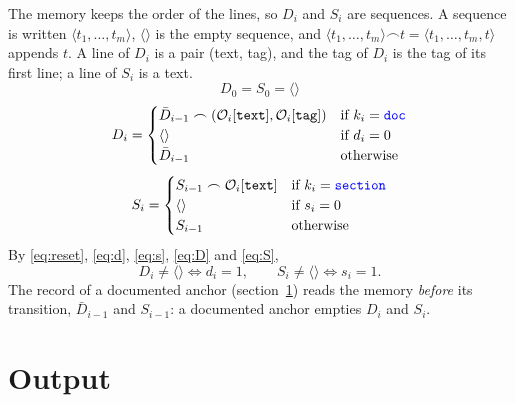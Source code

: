 \documentclass[11pt]{article}
\newcommand{\kind}[1]{\textcolor{blue}{\texttt{#1}}}
\newcommand{\field}[1]{\texttt{#1}}
\newcommand{\Obs}[1]{\mathcal{O}_i[\field{#1}]}
\newcommand{\emptyseq}{\langle\rangle}
\begin{document}
The memory keeps the order of the lines, so $D_i$ and $S_i$ are sequences. A sequence is
written $\langle t_1, \dots, t_m \rangle$, $\emptyseq$ is the empty sequence, and
$\langle t_1, \dots, t_m \rangle \frown t = \langle t_1, \dots, t_m, t \rangle$ appends $t$.
A line of $D_i$ is a pair (text, tag), and the tag of $D_i$ is the tag of its first line; a
line of $S_i$ is a text.
\begin{equation}
  D_0 = S_0 = \emptyseq
  \label{eq:memory-init}
\end{equation}
\begin{equation}
  D_i =
  \begin{cases}
    \bar D_{i-1} \frown (\Obs{text}, \Obs{tag}) & \text{if } k_i = \kind{doc}\\
    \emptyseq & \text{if } d_i = 0\\
    \bar D_{i-1} & \text{otherwise}
  \end{cases}
  \label{eq:D}
\end{equation}
\begin{equation}
  S_i =
  \begin{cases}
    S_{i-1} \frown \Obs{text} & \text{if } k_i = \kind{section}\\
    \emptyseq & \text{if } s_i = 0\\
    S_{i-1} & \text{otherwise}
  \end{cases}
  \label{eq:S}
\end{equation}
By \eqref{eq:reset}, \eqref{eq:d}, \eqref{eq:s}, \eqref{eq:D} and \eqref{eq:S},
\[
  D_i \ne \emptyseq \iff d_i = 1, \qquad S_i \ne \emptyseq \iff s_i = 1.
\]
The record of a documented anchor (section~\ref{sec:output}) reads the memory \emph{before}
its transition, $\bar D_{i-1}$ and $S_{i-1}$: a documented anchor empties $D_i$ and $S_i$.

\section{Output}
\label{sec:output}
\end{document}
